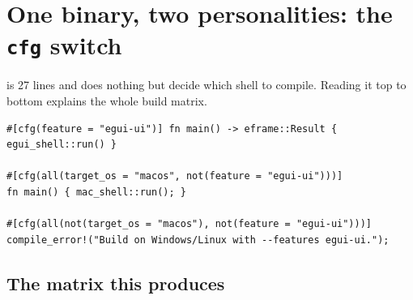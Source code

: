 \clearpage
\section{One binary, two personalities: the \texttt{cfg} switch}

 is 27 lines and does nothing but decide which shell to compile.
Reading it top to bottom explains the whole build matrix.

\begin{lstlisting}[caption={\file{src/main.rs}, complete.}]
#[cfg(feature = "egui-ui")] fn main() -> eframe::Result { egui_shell::run() }

#[cfg(all(target_os = "macos", not(feature = "egui-ui")))]
fn main() { mac_shell::run(); }

#[cfg(all(not(target_os = "macos"), not(feature = "egui-ui")))]
compile_error!("Build on Windows/Linux with --features egui-ui.");
\end{lstlisting}

\subsection{The matrix this produces}


